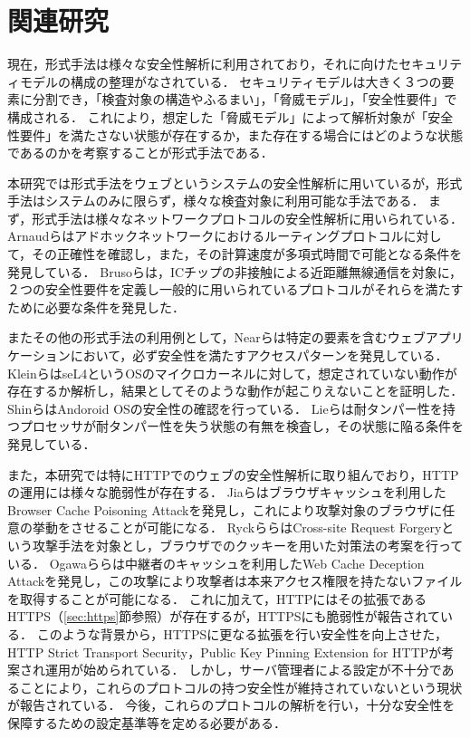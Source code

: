 \documentclass[12pt,a4paper]{jbook}
\begin{document}
\section{関連研究}
現在，形式手法は様々な安全性解析に利用されており，それに向けたセキュリティモデルの構成の整理がなされている\cite{security_modeling_and_analysis}．
セキュリティモデルは大きく３つの要素に分割でき，「検査対象の構造やふるまい」，「脅威モデル」，「安全性要件」で構成される．
これにより，想定した「脅威モデル」によって解析対象が「安全性要件」を満たさない状態が存在するか，また存在する場合にはどのような状態であるのかを考察することが形式手法である．


本研究では形式手法をウェブというシステムの安全性解析に用いているが，形式手法はシステムのみに限らず，様々な検査対象に利用可能な手法である．
まず，形式手法は様々なネットワークプロトコルの安全性解析に用いられている．
Arnaudら\cite{modeling-and-verifying-ad-hoc}はアドホックネットワークにおけるルーティングプロトコルに対して，その正確性を確認し，また，その計算速度が多項式時間で可能となる条件を発見している．
Brusoら\cite{formal-verification-of-privacy-for}は，ICチップの非接触による近距離無線通信\cite{formal-verification-of-privacy-for}を対象に，２つの安全性要件を定義し一般的に用いられているプロトコルがそれらを満たすために必要な条件を発見した．

またその他の形式手法の利用例として，Nearら\cite{finding_security_bugs_in_web}は特定の要素を含むウェブアプリケーションにおいて，必ず安全性を満たすアクセスパターンを発見している．
Kleinら\cite{sel4_formal_verification_of_an}はseL4というOSのマイクロカーネルに対して，想定されていない動作が存在するか解析し，結果としてそのような動作が起こりえないことを証明した．
Shinら\cite{towards_formal_analysis_of_the}はAndoroid OSの安全性の確認を行っている．
Lieら\cite{specifying_and_verifying_hardware_for_tamper}は耐タンパー性を持つプロセッサが耐タンパー性を失う状態の有無を検査し，その状態に陥る条件を発見している．

また，本研究では特にHTTPでのウェブの安全性解析に取り組んでおり，HTTPの運用には様々な脆弱性が存在する．
Jiaら\cite{bcpattack}はブラウザキャッシュを利用したBrowser Cache Poisoning Attackを発見し，これにより攻撃対象のブラウザに任意の挙動をさせることが可能になる．
Ryckら\cite{cookie-model}らはCross-site Request Forgeryという攻撃手法を対象とし，ブラウザでのクッキーを用いた対策法の考案を行っている．
Ogawaら\cite{WCD}らは中継者のキャッシュを利用したWeb Cache Deception Attackを発見し，この攻撃により攻撃者は本来アクセス権限を持たないファイルを取得することが可能になる．
これに加えて，HTTPにはその拡張であるHTTPS（\ref{sec:https}節参照）が存在するが，HTTPSにも脆弱性が報告されている\cite{poodle}．
このような背景から，HTTPSに更なる拡張を行い安全性を向上させた，HTTP Strict Transport Security\cite{hsts}，Public Key Pinning Extension for HTTP\cite{hpkp}が考案され運用が始められている．
しかし，サーバ管理者による設定が不十分であることにより，これらのプロトコルの持つ安全性が維持されていないという現状が報告されている\cite{hstshpkp}．
今後，これらのプロトコルの解析を行い，十分な安全性を保障するための設定基準等を定める必要がある．
\end{document}

